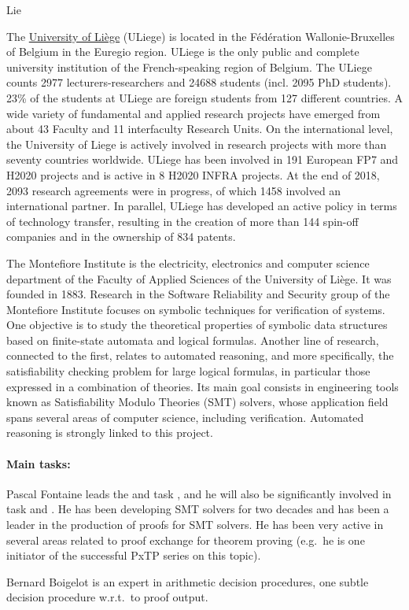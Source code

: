 \begin{sitedescription}{Lie}


The \href{http://www.uliege.be}{University of Liège} (ULiege) is located in the Fédération Wallonie-Bruxelles of Belgium in the Euregio region. ULiege is the only public and complete university institution of the French-speaking region of Belgium. The ULiege counts 2977 lecturers-researchers and 24688 students (incl. 2095 PhD students). 23\% of the students at ULiege are foreign students from 127 different countries. A wide variety of fundamental and applied research projects have emerged from about 43 Faculty and 11 interfaculty Research Units. On the international level, the University of Liege is actively involved in research projects with more than seventy countries worldwide. ULiege has been involved in 191 European FP7 and H2020 projects and is active in 8 H2020 INFRA projects. At the end of 2018, 2093 research agreements were in progress, of which 1458 involved an international partner. In parallel, ULiege has developed an active policy in terms of technology transfer, resulting in the creation of more than 144 spin-off companies and in the ownership of 834 patents.

The Montefiore Institute is the electricity, electronics and computer science
department of the Faculty of Applied Sciences of the University of Liège.  It
was founded in 1883.  Research in the Software Reliability and Security group of
the Montefiore Institute focuses on symbolic techniques for verification of
systems.  One objective is to study the theoretical properties of symbolic data
structures based on finite-state automata and logical formulas.  Another line of
research, connected to the first, relates to automated reasoning, and more
specifically, the satisfiability checking problem for large logical formulas, in
particular those expressed in a combination of theories.  Its main goal consists
in engineering tools known as Satisfiability Modulo Theories (SMT) solvers,
whose application field spans several areas of computer science, including
verification.  Automated reasoning is strongly linked to this project.

\paragraph*{Main tasks:}

\begin{compactitem}
\item Pascal Fontaine leads the  and task
  , and he will also be significantly involved in
  task  and .  He
  has been developing SMT solvers for two decades and has been a leader in the
  production of proofs for SMT solvers.  He has been very active in several
  areas related to proof exchange for theorem proving (e.g.\ he is one initiator
  of the successful PxTP series on this topic).
\item Bernard Boigelot is an expert in arithmetic decision procedures, one subtle decision procedure w.r.t.\ to proof output.
\end{compactitem}


\end{sitedescription}
